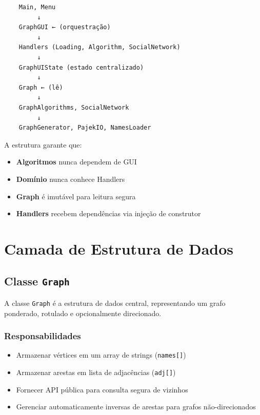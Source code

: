 \documentclass[12pt,a4paper]{article}
\begin{document}
    \begin{verbatim}
    Main, Menu
         ↓
    GraphGUI ← (orquestração)
         ↓
    Handlers (Loading, Algorithm, SocialNetwork)
         ↓
    GraphUIState (estado centralizado)
         ↓
    Graph ← (lê)
         ↓
    GraphAlgorithms, SocialNetwork
         ↓
    GraphGenerator, PajekIO, NamesLoader
    \end{verbatim}

    A estrutura garante que:
    \begin{itemize}
        \item \textbf{Algoritmos} nunca dependem de GUI
        \item \textbf{Domínio} nunca conhece Handlers
        \item \textbf{Graph} é imutável para leitura segura
        \item \textbf{Handlers} recebem dependências via injeção de construtor
    \end{itemize}

    \newpage

    \section{Camada de Estrutura de Dados}

    \subsection{Classe \texttt{Graph}}

    A classe \texttt{Graph} é a estrutura de dados central, representando um grafo ponderado, rotulado e opcionalmente direcionado.

    \subsubsection{Responsabilidades}

    \begin{itemize}
        \item Armazenar vértices em um array de strings (\texttt{names[]})
        \item Armazenar arestas em lista de adjacências (\texttt{adj[]})
        \item Fornecer API pública para consulta segura de vizinhos
        \item Gerenciar automaticamente inversas de arestas para grafos não-direcionados
    \end{itemize}
\end{document}
